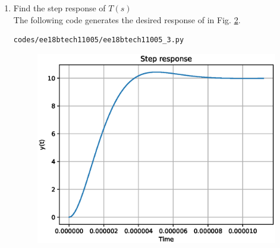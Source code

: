 \begin{enumerate}[label=\arabic*.,ref=\theenumi]
\begin{figure}[!ht]
\caption{}
\label{fig:ee18btech11005_1}
\end{figure}
\item Find the step response of $T(s)$
\\
\solution The following code generates the desired response of in Fig. \ref{fig:ee18btech11005_2}.
\begin{lstlisting}
codes/ee18btech11005/ee18btech11005_3.py
\end{lstlisting}
%
\begin{figure}[!ht]
\centering
\includegraphics[width=\columnwidth]{./figs/ee18btech11005/ee18btech11005_2.eps}
\caption{}
\label{fig:ee18btech11005_2}
\end{figure}


\end{enumerate}
